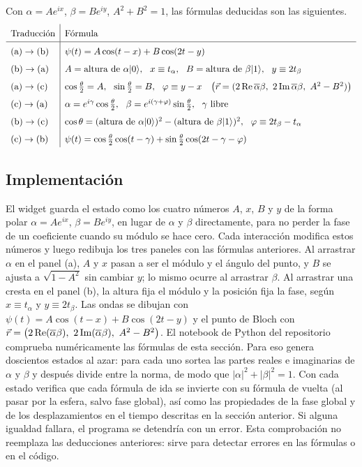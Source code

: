 Con $\alpha=Ae^{ix}$, $\beta=Be^{iy}$, $A^2+B^2=1$, las fórmulas deducidas son las siguientes.
\[
\renewcommand{\arraystretch}{1.6}
\begin{array}{l|l}
\text{Traducción} & \text{Fórmula}\\ \hline
\text{(a)}\to\text{(b)} & \psi(t)=A\cos(t-x)+B\cos(2t-y)\\
\text{(b)}\to\text{(a)} & A=\text{altura de }\alpha\ket0,\ \ x\equiv t_\alpha,\ \
  B=\text{altura de }\beta\ket1,\ \ y\equiv 2t_\beta\\
\text{(a)}\to\text{(c)} & \cos\frac\theta2=A,\ \ \sin\frac\theta2=B,\ \ \varphi\equiv y-x
  \quad\bigl(\vec r=(2\Real\overline\alpha\beta,\ 2\Imag\overline\alpha\beta,\ A^2-B^2)\bigr)\\
\text{(c)}\to\text{(a)} & \alpha=e^{i\gamma}\cos\frac\theta2,\ \
  \beta=e^{i(\gamma+\varphi)}\sin\frac\theta2,\ \ \gamma \text{ libre}\\
\text{(b)}\to\text{(c)} & \cos\theta=(\text{altura de }\alpha\ket0)^2-(\text{altura de }\beta\ket1)^2,\ \
  \varphi\equiv 2t_\beta-t_\alpha\\
\text{(c)}\to\text{(b)} & \psi(t)=\cos\frac\theta2\cos(t-\gamma)+\sin\frac\theta2\cos(2t-\gamma-\varphi)
\end{array}
\]

\subsection*{Implementación}

El widget guarda el estado como los cuatro números $A$, $x$, $B$ y $y$ de la forma polar
$\alpha=Ae^{ix}$, $\beta=Be^{iy}$, en lugar de $\alpha$ y $\beta$ directamente, para no perder la
fase de un coeficiente cuando su módulo se hace cero. Cada interacción modifica estos números y
luego redibuja los tres paneles con las fórmulas anteriores. Al arrastrar $\alpha$ en el
panel (a), $A$ y $x$ pasan a ser el módulo y el ángulo del punto, y $B$ se ajusta a
$\sqrt{1-A^2}$ sin cambiar $y$; lo mismo ocurre al arrastrar $\beta$. Al arrastrar una cresta en
el panel (b), la altura fija el módulo y la posición fija la fase, según
$x\equiv t_\alpha$ y $y\equiv 2t_\beta$. Las ondas se dibujan con
$\psi(t)=A\cos(t-x)+B\cos(2t-y)$ y el punto de Bloch con
$\vec r=\bigl(2\Real(\overline\alpha\beta),\ 2\Imag(\overline\alpha\beta),\ A^2-B^2\bigr)$. El
notebook de Python del repositorio comprueba numéricamente las fórmulas de esta sección. Para eso genera doscientos estados al azar: para cada uno sortea las partes reales e imaginarias de $\alpha$ y $\beta$ y después divide entre la norma, de modo que $|\alpha|^2+|\beta|^2=1$. Con cada estado verifica que cada fórmula de ida se invierte con su fórmula de vuelta (al pasar por la esfera, salvo fase global), así como las propiedades de la fase global y de los desplazamientos en el tiempo descritas en la sección anterior. Si alguna igualdad fallara, el programa se detendría con un error. Esta comprobación no reemplaza las deducciones anteriores: sirve para detectar errores en las fórmulas o en el código.